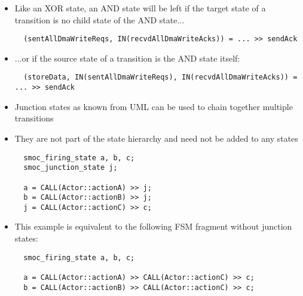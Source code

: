 \begin{frame}[fragile=singleslide]
\begin{itemize}
\item Like an XOR state, an AND state will be left if the target state of a transition is no child state of the AND state...
\begin{lstlisting}
  (sentAllDmaWriteReqs, IN(recvdAllDmaWriteAcks)) = ... >> sendAck
\end{lstlisting}
\item ...or if the source state of a transition is the AND state itself:
\begin{lstlisting}
  (storeData, IN(sentAllDmaWriteReqs), IN(recvdAllDmaWriteAcks)) = ... >> sendAck
\end{lstlisting}
\end{itemize}
\end{frame}

\begin{frame}[fragile=singleslide]
\begin{itemize}
\item Junction states as known from UML can be used to chain together multiple transitions
\item They are not part of the state hierarchy and need not be added to any states
\begin{lstlisting}
  smoc_firing_state a, b, c;
  smoc_junction_state j;
    
  a = CALL(Actor::actionA) >> j;
  b = CALL(Actor::actionB) >> j;
  j = CALL(Actor::actionC) >> c; 
\end{lstlisting}
\item This example is equivalent to the following FSM fragment without junction states:
\begin{lstlisting}
  smoc_firing_state a, b, c;
    
  a = CALL(Actor::actionA) >> CALL(Actor::actionC) >> c;
  b = CALL(Actor::actionB) >> CALL(Actor::actionC) >> c;
\end{lstlisting}
\end{itemize}
\end{frame}


